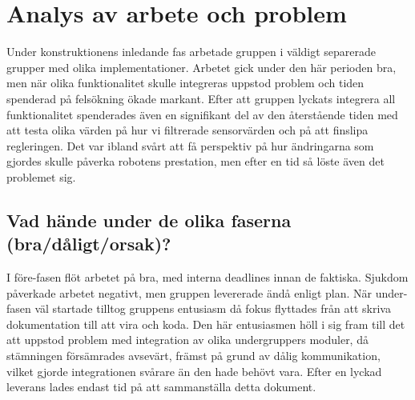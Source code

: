 \documentclass{article}
\begin{document}
\clearpage
\section{Analys av arbete och problem}
Under konstruktionens inledande fas arbetade gruppen i väldigt separerade grupper med olika implementationer. Arbetet gick under den här perioden bra, men när olika funktionalitet skulle integreras uppstod problem och tiden spenderad på felsökning ökade markant. Efter att gruppen lyckats integrera all funktionalitet spenderades även en signifikant del av den återstående tiden med att testa olika värden på hur vi filtrerade sensorvärden och på att finslipa regleringen. Det var ibland svårt att få perspektiv på hur ändringarna som gjordes skulle påverka robotens prestation, men efter en tid så löste även det problemet sig.

\subsection{Vad hände under de olika faserna (bra/dåligt/orsak)?}
I före-fasen flöt arbetet på bra, med interna deadlines innan de faktiska. Sjukdom påverkade arbetet negativt, men gruppen levererade ändå enligt plan. När under-fasen väl startade tilltog gruppens entusiasm då fokus flyttades från att skriva dokumentation till att vira och koda. Den här entusiasmen höll i sig fram till det att uppstod problem med integration av olika undergruppers moduler, då stämningen försämrades avsevärt, främst på grund av dålig kommunikation, vilket gjorde integrationen svårare än den hade behövt vara. Efter en lyckad leverans lades endast tid på att sammanställa detta dokument.
\end{document}
